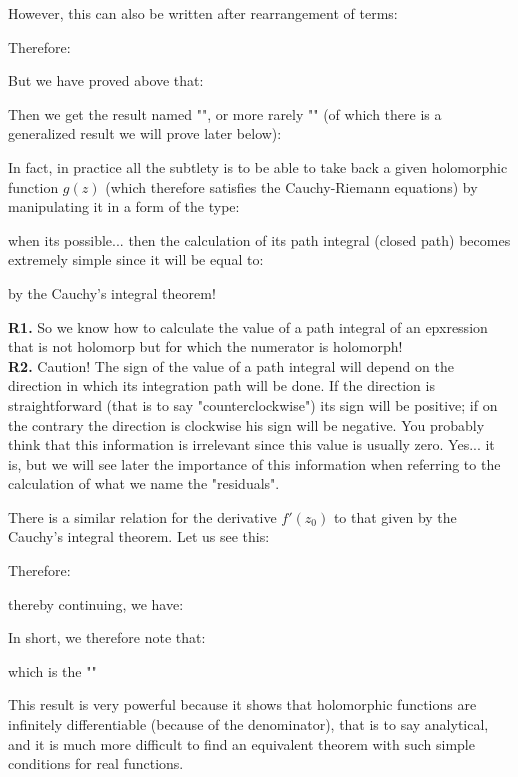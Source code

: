 	However, this can also be written after rearrangement of terms:
	
	Therefore:
	
	But we have proved above that:
	
	Then we get the result named "", or more rarely "" (of which there is a generalized result we will prove later below):
	
	In fact, in practice all the subtlety is to be able to take back a given holomorphic function $g(z)$ (which therefore satisfies the Cauchy-Riemann equations) by manipulating it in a form of the type:
	
	when its possible... then the calculation of its path integral (closed path) becomes extremely simple since it will be equal to:
	
	by the Cauchy's integral theorem!
	
	\begin{tcolorbox}[title=Remarks,colframe=black,arc=10pt]
\textbf{R1.} So we know how to calculate the value of a path integral of an epxression that is not holomorp but for which the numerator is holomorph!\\

\textbf{R2.} Caution! The sign of the value of a path integral will depend on the direction in which its integration path will be done. If the direction is straightforward (that is to say "counterclockwise") its sign will be positive; if on the contrary the direction is clockwise his sign will be negative. You probably think that this information is irrelevant since this value is usually zero. Yes... it is, but we will see later the importance of this information when referring to the calculation of what we name the "residuals".
	\end{tcolorbox}
	
	There is a similar relation for the derivative $f'(z_0)$ to that given by the Cauchy's integral theorem. Let us see this:
	
	Therefore:
	
	thereby continuing, we have:
	
	In short, we therefore note that:
	
	which is the ""
	
	This result is very powerful because it shows that holomorphic functions are infinitely differentiable (because of the denominator), that is to say analytical, and it is much more difficult to find an equivalent theorem with such simple conditions for real functions.
	
